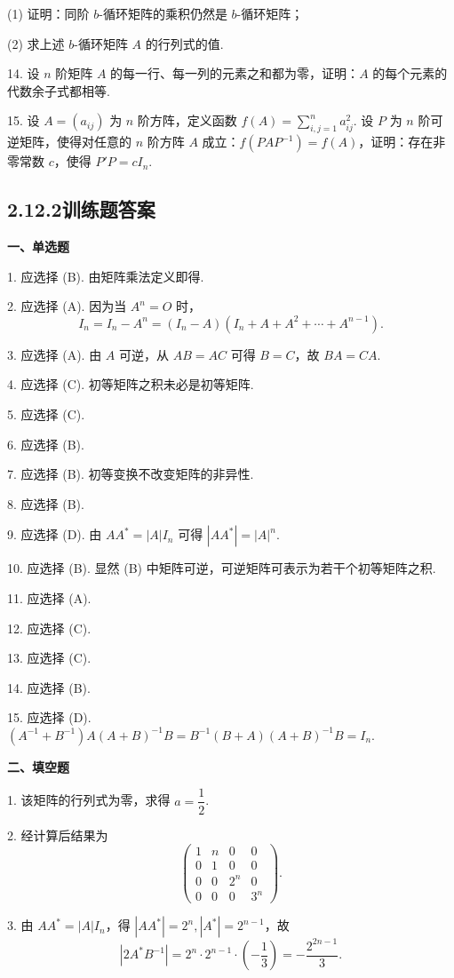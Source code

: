 \documentclass[UTF8, 12pt, fontset=fandol, oneside]{ctexart}
\begin{document}
(1) 证明：同阶 $b$-循环矩阵的乘积仍然是 $b$-循环矩阵；

(2) 求上述 $b$-循环矩阵 $A$ 的行列式的值.

14. 设 $n$ 阶矩阵 $A$ 的每一行、每一列的元素之和都为零，证明：$A$ 的每个元素的代数余子式都相等.

15. 设 $A=(a_{ij})$ 为 $n$ 阶方阵，定义函数 $f(A)=\sum\limits_{i,j=1}^n a_{ij}^2$. 设 $P$ 为 $n$ 阶可逆矩阵，使得对任意的 $n$ 阶方阵 $A$ 成立：$f(PAP^{-1})=f(A)$，证明：存在非零常数 $c$，使得 $P'P=cI_n$.

\subsection*{2.12.2\quad 训练题答案}

\noindent\textbf{一、单选题}

1. 应选择 (B). 由矩阵乘法定义即得.

2. 应选择 (A). 因为当 $A^n=O$ 时，
\[
I_n=I_n-A^n=(I_n-A)(I_n+A+A^2+\cdots+A^{n-1}).
\]

3. 应选择 (A). 由 $A$ 可逆，从 $AB=AC$ 可得 $B=C$，故 $BA=CA$.

4. 应选择 (C). 初等矩阵之积未必是初等矩阵.

5. 应选择 (C).

6. 应选择 (B).

7. 应选择 (B). 初等变换不改变矩阵的非异性.

8. 应选择 (B).

9. 应选择 (D). 由 $AA^*=|A|I_n$ 可得 $|AA^*|=|A|^n$.

10. 应选择 (B). 显然 (B) 中矩阵可逆，可逆矩阵可表示为若干个初等矩阵之积.

11. 应选择 (A).

12. 应选择 (C).

13. 应选择 (C).

14. 应选择 (B).

15. 应选择 (D). $(A^{-1}+B^{-1})A(A+B)^{-1}B=B^{-1}(B+A)(A+B)^{-1}B=I_n$.

\noindent\textbf{二、填空题}

1. 该矩阵的行列式为零，求得 $a=\dfrac12$.

2. 经计算后结果为
\[
\left(
\begin{array}{cccc}
1 & n & 0 & 0\\
0 & 1 & 0 & 0\\
0 & 0 & 2^n & 0\\
0 & 0 & 0 & 3^n
\end{array}
\right).
\]

3. 由 $AA^*=|A|I_n$，得 $|AA^*|=2^n, |A^*|=2^{n-1}$，故
\[
|2A^*B^{-1}|=2^n\cdot2^{n-1}\cdot\left(-\frac13\right)
=-\frac{2^{2n-1}}3.
\]
\end{document}
